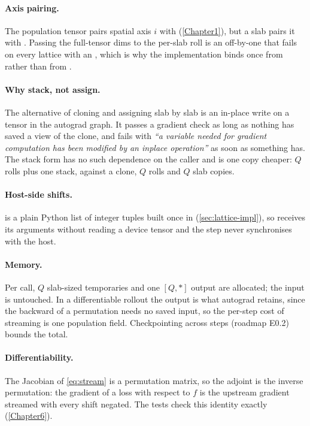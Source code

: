 \paragraph{Axis pairing.}
The population tensor pairs spatial axis $i$ with 
(\cref{Chapter1}), but a slab  pairs it with . Passing the
full-tensor dims to the per-slab roll is an off-by-one that fails on every lattice with an
, which is why the implementation binds  once from
 rather than from .

\paragraph{Why stack, not assign.}
The alternative of cloning  and assigning  slab by slab
is an in-place write on a tensor in the autograd graph. It passes a gradient check as long
as nothing has saved a view of the clone, and fails with \emph{``a variable needed for
gradient computation has been modified by an inplace operation''} as soon as something has.
The stack form has no such dependence on the caller and is one copy cheaper: $Q$ rolls plus
one stack, against a clone, $Q$ rolls and $Q$ slab copies.

\paragraph{Host-side shifts.}
 is a plain Python list of integer tuples built once in
 (\cref{sec:lattice-impl}), so  receives its
arguments without reading a device tensor and the step never synchronises with the host.

\paragraph{Memory.}
Per call, $Q$ slab-sized temporaries and one $[Q, \ast]$ output are allocated; the input is
untouched. In a differentiable rollout the output is what autograd retains, since the
backward of a permutation needs no saved input, so the per-step cost of streaming is one
population field. Checkpointing across steps (roadmap E0.2) bounds the total.

\paragraph{Differentiability.}
The Jacobian of \cref{eq:stream} is a permutation matrix, so the adjoint is the inverse
permutation: the gradient of a loss with respect to $f$ is the upstream gradient streamed
with every shift negated. The tests check this identity exactly (\cref{Chapter6}).

